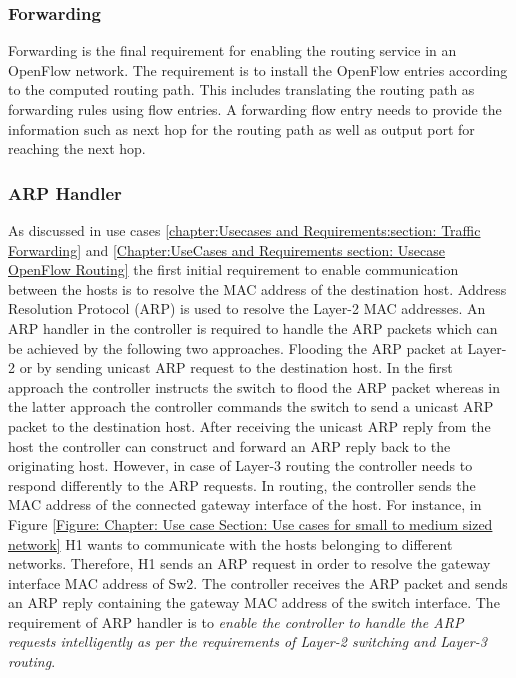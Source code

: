 \subsubsection{Forwarding }

Forwarding is the final requirement for enabling the routing service in an OpenFlow network. The requirement is to install the OpenFlow entries according to the computed routing path. This includes translating the routing path as forwarding rules using flow entries. A forwarding flow entry needs to provide the information such as next hop for the routing path as well as output port for reaching the next hop.

\subsubsection {ARP Handler }
\label{Chapter: Use cases and Requirements:Section: Routing Requirements: Subsection: Arp Handler}

As discussed in use cases \ref{chapter:Usecases and Requirements:section: Traffic Forwarding} and \ref{Chapter:UseCases and Requirements section: Usecase OpenFlow Routing} the first initial requirement to enable communication between the hosts is to resolve the MAC address of the destination host. Address Resolution Protocol (ARP) is used to resolve the Layer-2 MAC addresses. An ARP handler in the controller is required to handle the ARP packets which can be achieved by the following two approaches. Flooding the ARP packet at Layer-2 or by sending unicast ARP request to the destination host. In the first approach the controller instructs the switch to flood the ARP packet whereas in the latter approach the controller commands the switch to send a unicast ARP packet to the destination host. After receiving the unicast ARP reply from the host the controller can construct and forward an ARP reply back to the originating host. However, in case of Layer-3 routing the controller needs to respond differently to the ARP requests. In routing, the controller sends the MAC address of the connected gateway interface of the host. For instance, in Figure \ref{Figure: Chapter: Use case Section: Use cases for small to medium sized network} H1 wants to communicate with the hosts belonging to different networks. Therefore, H1 sends an ARP request in order to resolve the gateway interface MAC address of Sw2. The controller receives the ARP packet and sends an ARP reply containing the gateway MAC address of the switch interface. The requirement of ARP handler is to\textit{ enable the controller to handle the ARP requests intelligently as per the requirements of Layer-2 switching and Layer-3 routing}.
